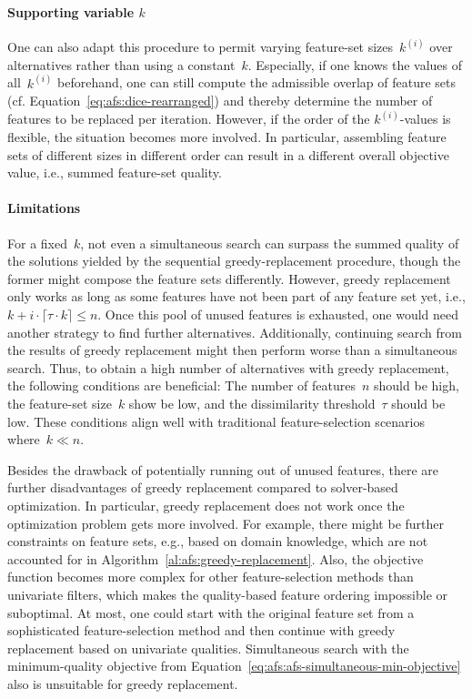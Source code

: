 \documentclass{article}
\theoremstyle{definition}
\begin{document}
\paragraph{Supporting variable $k$}

One can also adapt this procedure to permit varying feature-set sizes~$k^{(i)}$ over alternatives rather than using a constant~$k$.
Especially, if one knows the values of all~$k^{(i)}$ beforehand, one can still compute the admissible overlap of feature sets (cf. Equation~\ref{eq:afs:dice-rearranged}) and thereby determine the number of features to be replaced per iteration.
However, if the order of the $k^{(i)}$-values is flexible, the situation becomes more involved.
In particular, assembling feature sets of different sizes in different order can result in a different overall objective value, i.e., summed feature-set quality.

\paragraph{Limitations}

For a fixed~$k$, not even a simultaneous search can surpass the summed quality of the solutions yielded by the sequential greedy-replacement procedure, though the former might compose the feature sets differently.
However, greedy replacement only works as long as some features have not been part of any feature set yet, i.e., $k + i \cdot \lceil \tau \cdot k \rceil \leq n$.
Once this pool of unused features is exhausted, one would need another strategy to find further alternatives.
Additionally, continuing search from the results of greedy replacement might then perform worse than a simultaneous search.
Thus, to obtain a high number of alternatives with greedy replacement, the following conditions are beneficial:
The number of features~$n$ should be high, the feature-set size~$k$ show be low, and the dissimilarity threshold~$\tau$ should be low.
These conditions align well with traditional feature-selection scenarios where~$k \ll n$.

Besides the drawback of potentially running out of unused features, there are further disadvantages of greedy replacement compared to solver-based optimization.
In particular, greedy replacement does not work once the optimization problem gets more involved.
For example, there might be further constraints on feature sets, e.g., based on domain knowledge, which are not accounted for in Algorithm~\ref{al:afs:greedy-replacement}.
Also, the objective function becomes more complex for other feature-selection methods than univariate filters, which makes the quality-based feature ordering impossible or suboptimal.
At most, one could start with the original feature set from a sophisticated feature-selection method and then continue with greedy replacement based on univariate qualities.
Simultaneous search with the minimum-quality objective from Equation~\ref{eq:afs:afs-simultaneous-min-objective} also is unsuitable for greedy replacement.
\end{document}
